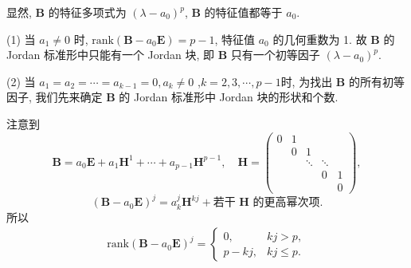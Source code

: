 \documentclass[../../main.tex]{subfiles}
\begin{document}
\begin{solution}
显然, $\boldsymbol{B}$ 的特征多项式为 $(\lambda - a_0)^p$, $\boldsymbol{B}$ 的特征值都等于 $a_0$.

(1) 当 $a_1 \neq 0$ 时, $\mathrm{rank}(\boldsymbol{B} - a_0\boldsymbol{E}) = p - 1$, 特征值 $a_0$ 的几何重数为 1. 故 $\boldsymbol{B}$ 的 Jordan 标准形中只能有一个 Jordan 块, 即 $\boldsymbol{B}$ 只有一个初等因子 $(\lambda - a_0)^p$.

(2) 当 $a_1 = a_2 = \cdots = a_{k-1} = 0, a_k \neq 0$ ,$k=2,3,\cdots,p-1$时, 为找出 $\boldsymbol{B}$ 的所有初等因子, 我们先来确定 $\boldsymbol{B}$ 的 Jordan 标准形中 Jordan 块的形状和个数.

注意到
\[
\boldsymbol{B} = a_0\boldsymbol{E} + a_1\boldsymbol{H}^1 + \cdots + a_{p-1}\boldsymbol{H}^{p-1}, \quad \boldsymbol{H} = \begin{pmatrix} 
0 & 1 & & \\
& 0 & 1 & \\
& & \ddots & \ddots \\
& & & 0 & 1 \\
& & & & 0 
\end{pmatrix},
\]
\[
(\boldsymbol{B} - a_0\boldsymbol{E})^j = a_k^j\boldsymbol{H}^{kj} + \text{若干 } \boldsymbol{H} \text{ 的更高幂次项}.
\]
所以
\begin{align}
\mathrm{rank}(\boldsymbol{B} - a_0\boldsymbol{E})^j = \begin{cases} 
0, & kj > p, \\
p - kj, & kj \leqslant p.
\end{cases}\label{eq::::::--000002}
\end{align}


\end{solution}
\end{document}
